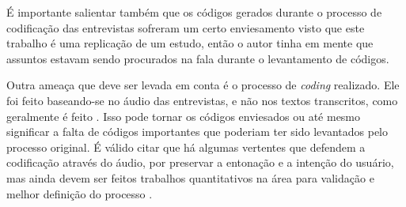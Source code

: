 É importante salientar também que os códigos gerados durante o processo de codificação das entrevistas sofreram um certo enviesamento visto que este trabalho é uma replicação de um estudo, então o autor tinha em mente que assuntos estavam sendo procurados na fala durante o levantamento de códigos. 

Outra ameaça que deve ser levada em conta é o processo de \emph{coding} realizado. Ele foi feito baseando-se no áudio das entrevistas, e não nos textos transcritos, como geralmente é feito \cite{groundedTheory}. Isso pode tornar os códigos enviesados ou até mesmo significar a falta de códigos importantes que poderiam ter sido levantados pelo processo original. É válido citar que há algumas vertentes que defendem a codificação através do áudio, por preservar a entonação e a intenção do usuário, mas ainda devem ser feitos trabalhos quantitativos na área para validação e melhor definição do processo \cite{listenCode}. 
